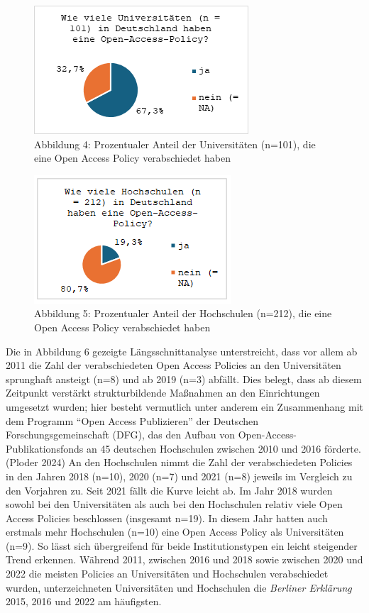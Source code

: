 \documentclass[a4paper,
fontsize=11pt,
oneside,
numbers=noperiodatend,
parskip=half-,
bibliography=totoc,
final
]{scrartcl}
\begin{document}
\begin{figure}[H]
\centering
\includegraphics[]{img/image005.png}
\caption{Abbildung 4: Prozentualer Anteil der Universitäten (n=101), die eine Open Access Policy verabschiedet haben}
\end{figure}

\begin{figure}[H]
\centering
\includegraphics[]{img/image004.png}
\caption{Abbildung 5: Prozentualer Anteil der Hochschulen (n=212), die eine Open Access Policy verabschiedet haben}
\end{figure}

Die in Abbildung 6 gezeigte Längsschnittanalyse unterstreicht, dass vor
allem ab 2011 die Zahl der verabschiedeten Open Access Policies an den
Universitäten sprunghaft ansteigt (n=8) und ab 2019 (n=3) abfällt. Dies
belegt, dass ab diesem Zeitpunkt verstärkt strukturbildende Maßnahmen an
den Einrichtungen umgesetzt wurden; hier besteht vermutlich unter
anderem ein Zusammenhang mit dem Programm \enquote{Open Access
Publizieren} der Deutschen Forschungsgemeinschaft (DFG), das den Aufbau
von Open-Access-Publikationsfonds an 45 deutschen Hochschulen zwischen
2010 und 2016 förderte. (Ploder 2024) An den Hochschulen nimmt die Zahl
der verabschiedeten Policies in den Jahren 2018 (n=10), 2020 (n=7) und
2021 (n=8) jeweils im Vergleich zu den Vorjahren zu. Seit 2021 fällt die
Kurve leicht ab. Im Jahr 2018 wurden sowohl bei den Universitäten als
auch bei den Hochschulen relativ viele Open Access Policies beschlossen
(insgesamt n=19). In diesem Jahr hatten auch erstmals mehr Hochschulen
(n=10) eine Open Access Policy als Universitäten (n=9). So lässt sich
übergreifend für beide Institutionstypen ein leicht steigender Trend
erkennen. Während 2011, zwischen 2016 und 2018 sowie zwischen 2020 und
2022 die meisten Policies an Universitäten und Hochschulen verabschiedet
wurden, unterzeichneten Universitäten und Hochschulen die \emph{Berliner
Erklärung} 2015, 2016 und 2022 am häufigsten.
\end{document}
